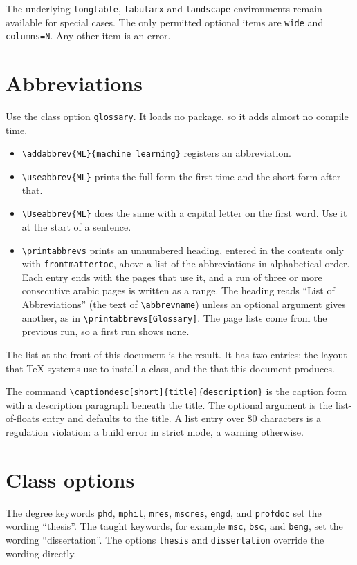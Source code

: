 \documentclass[dissertation,tables,glossary,12pt,a4paper]{bangor}
\begin{document}
The underlying \verb|longtable|, \verb|tabularx| and \verb|landscape| environments remain available for special cases. The only permitted optional items are \verb|wide| and \verb|columns=N|. Any other item is an error.

\chapter{Abbreviations}
Use the class option \verb|glossary|. It loads no package, so it adds almost no compile time.

\begin{itemize}
  \item \verb|\addabbrev{ML}{machine learning}| registers an abbreviation.
  \item \verb|\useabbrev{ML}| prints the full form the first time and the short form after that.
  \item \verb|\Useabbrev{ML}| does the same with a capital letter on the first word. Use it at the start of a sentence.
  \item \verb|\printabbrevs| prints an unnumbered heading, entered in the contents only with \verb|frontmattertoc|, above a list of the abbreviations in alphabetical order. Each entry ends with the pages that use it, and a run of three or more consecutive arabic pages is written as a range. The heading reads ``List of Abbreviations'' (the text of \verb|\abbrevname|) unless an optional argument gives another, as in \verb|\printabbrevs[Glossary]|. The page lists come from the previous run, so a first run shows none.
\end{itemize}

The list at the front of this document is the result. It has two entries: the  layout that TeX systems use to install a class, and the  that this document produces.

The command \verb|\captiondesc[short]{title}{description}| is the caption form with a description paragraph beneath the title. The optional argument is the list-of-floats entry and defaults to the title. A list entry over 80 characters is a regulation violation: a build error in strict mode, a warning otherwise.

\chapter{Class options}
The degree keywords \verb|phd|, \verb|mphil|, \verb|mres|, \verb|mscres|, \verb|engd|, and \verb|profdoc| set the wording ``thesis''. The taught keywords, for example \verb|msc|, \verb|bsc|, and \verb|beng|, set the wording ``dissertation''. The options \verb|thesis| and \verb|dissertation| override the wording directly.
\end{document}
